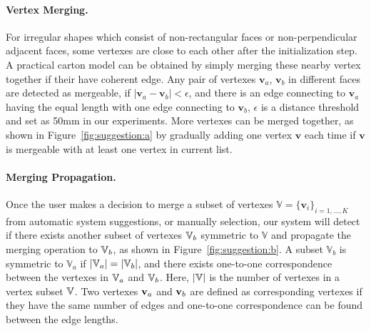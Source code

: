 \paragraph{Vertex Merging.} 
For irregular shapes which consist of non-rectangular faces or non-perpendicular adjacent faces, some vertexes are close to each other after the initialization step.
A practical carton model can be obtained by simply merging these nearby vertex together if their have coherent edge.
%
Any pair of vertexes $\mathbf{v}_a$, $\mathbf{v}_b$ in different faces are detected as mergeable, if $|\mathbf{v}_a-\mathbf{v}_b|<\epsilon$, and there is an edge connecting to $\mathbf{v}_a$ having the equal length with one edge connecting to $\mathbf{v}_b$,
%
$\epsilon$ is a distance threshold and set as 50mm in our experiments.
More vertexes can be merged together, as shown in Figure~\ref{fig:suggestion:a} by gradually adding one vertex $\mathbf{v}$ each time if $\mathbf{v}$ is mergeable with at least one vertex in current list. 

\paragraph{Merging Propagation.} %
Once the user makes a decision to merge a subset of vertexes $\mathbb{V}=\{\mathbf{v}_i\}_{i=1,\ldots,K}$ from automatic system suggestions, or manually selection, our system will detect if there exists another subset of vertexes $\mathbb{V}_b$ symmetric to $\mathbb{V}$ and propagate the merging operation to $\mathbb{V}_b$, as shown in Figure~\ref{fig:suggestion:b}. 
A subset $\mathbb{V}_b$ is symmetric to $\mathbb{V}_a$ if $|\mathbb{V}_a|=|\mathbb{V}_b|$, and there exists one-to-one correspondence between the vertexes in $\mathbb{V}_a$ and $\mathbb{V}_b$. 
Here, $|\mathbb{V}|$ is the number of vertexes in a vertex subset $\mathbb{V}$. 
Two vertexes $\mathbf{v}_a$ and $\mathbf{v}_b$ are defined as corresponding vertexes if they have the same number of edges and one-to-one correspondence can be found between the edge lengths. 


